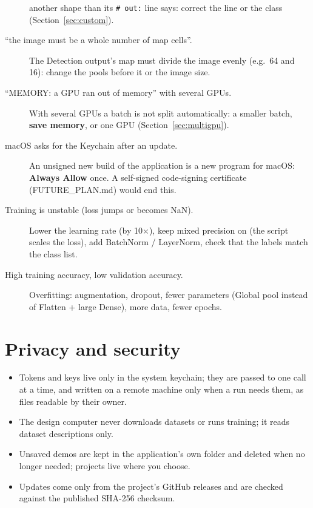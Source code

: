 \documentclass[11pt,a4paper]{article}
\newcommand{\ui}[1]{\textbf{\textsf{#1}}}
\begin{document}
\begin{description}
        another shape than its \texttt{\# out:} line says: correct the line or the class (Section~\ref{sec:custom}).
  \item[``the image must be a whole number of map cells''.] The Detection output's map must divide the image evenly (e.g.\ 64 and 16):
        change the pools before it or the image size.
  \item[``MEMORY: a GPU ran out of memory'' with several GPUs.] With several GPUs a batch is not split automatically: a smaller batch,
        \ui{save memory}, or one GPU (Section~\ref{sec:multigpu}).
  \item[macOS asks for the Keychain after an update.] An unsigned new build of the application is a new program for macOS: \ui{Always
        Allow} once. A self-signed code-signing certificate (FUTURE\_PLAN.md) would end this.
  \item[Training is unstable (loss jumps or becomes NaN).] Lower the learning rate (by 10$\times$), keep mixed precision on (the script
        scales the loss), add BatchNorm / LayerNorm, check that the labels match the class list.
  \item[High training accuracy, low validation accuracy.] Overfitting: augmentation, dropout, fewer parameters (Global pool instead of
        Flatten + large Dense), more data, fewer epochs.
\end{description}

\section{Privacy and security}
\begin{itemize}
  \item Tokens and keys live only in the system keychain; they are passed to one call at a time, and written on a remote machine only
        when a run needs them, as files readable by their owner.
  \item The design computer never downloads datasets or runs training; it reads dataset descriptions only.
  \item Unsaved demos are kept in the application's own folder and deleted when no longer needed; projects live where you choose.
  \item Updates come only from the project's GitHub releases and are checked against the published SHA-256 checksum.
\end{itemize}
\end{document}
